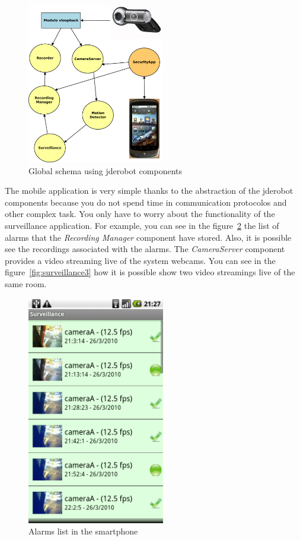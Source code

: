 \documentclass[twocolumn]{svjour3}          %
\begin{document}
\begin{figure}
\includegraphics[width=6cm]{figs/surveillance-img1.png}
\caption{Global schema using jderobot components}
\label{fig:surveillance1}
\end{figure}

The mobile application is very simple thanks to the abstraction of the
jderobot components because you do not spend time in communication
protocolos and other complex task. You only have to worry about the
functionality of the surveillance application. For example, you can
see in the figure~\ref{fig:surveillance2} the list of alarms that the
\emph{Recording Manager} component have stored. Also, it is possible
see the recordings associated with the alarms. The \emph{CameraServer}
component provides a video streaming live of the system webcams. You
can see in the figure~\ref{fig:surveillance3} how it is possible show
two video streamings live of the same room.

\begin{figure}
\includegraphics[width=6cm]{figs/surveillance-android.png}
\caption{Alarms list in the smartphone}
\label{fig:surveillance2}
\end{figure}
\end{document}
